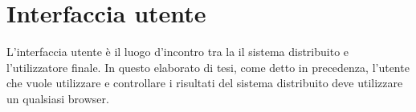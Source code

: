 \section{Interfaccia utente}
\label{sec:userInterface}
L'interfaccia utente è il luogo d'incontro tra la il sistema distribuito e l'utilizzatore finale. In questo elaborato di tesi, come detto in precedenza, l'utente che vuole utilizzare e controllare i risultati del sistema distribuito deve utilizzare un qualsiasi browser. 